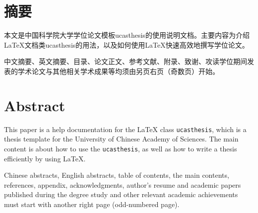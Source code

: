 \maketitle%
\MAKETITLE%
\makedeclaration%
\intobmk\chapter*{摘\quad 要}%
\setcounter{page}{1}%

本文是中国科学院大学学位论文模板ucasthesis的使用说明文档。主要内容为介绍\LaTeX{}文档类ucasthesis的用法，以及如何使用\LaTeX{}快速高效地撰写学位论文。

中文摘要、英文摘要、目录、论文正文、参考文献、附录、致谢、攻读学位期间发表的学术论文与其他相关学术成果等均须由另页右页（奇数页）开始。

\intobmk\chapter*{Abstract}%

This paper is a help documentation for the \LaTeX{} class \texttt{ucasthesis}, which is a thesis template for the University of Chinese Academy of Sciences. The main content is about how to use the \texttt{ucasthesis}, as well as how to write a thesis efficiently by using \LaTeX{}.

Chinese abstracts, English abstracts, table of contents, the main contents, references, appendix, acknowledgments, author's resume and academic papers published during the degree study and other relevant academic achievements must start with another right page (odd-numbered page).


\pagestyle{enfrontmatterstyle}%
\cleardoublepage\pagestyle{frontmatterstyle}%

